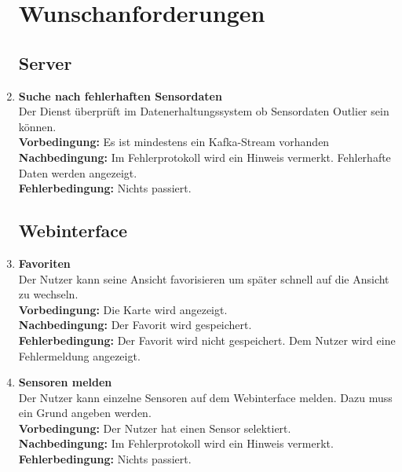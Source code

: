 \begin{enumerate}[label=\textbf{WF\arabic{enumi}0}]
	\setcounter{enumi}{99}
	\section{Wunschanforderungen}
	
	\subsection{Server}
	
	\item \textbf{Suche nach fehlerhaften Sensordaten}\\
	Der Dienst überprüft im Datenerhaltungssystem ob Sensordaten Outlier sein können.\\
	\textbf{Vorbedingung:} Es ist mindestens ein Kafka-Stream vorhanden\\
	\textbf{Nachbedingung:} Im Fehlerprotokoll wird ein Hinweis vermerkt. Fehlerhafte Daten werden angezeigt.\\
	\textbf{Fehlerbedingung:} Nichts passiert.
		
	\subsection{Webinterface}
	\setcounter{enumi}{199}
	
	\item \textbf{Favoriten}\\
		Der Nutzer kann seine Ansicht favorisieren um später schnell auf die Ansicht zu wechseln.\\
		\textbf{Vorbedingung:} Die Karte wird angezeigt.\\
		\textbf{Nachbedingung:} Der Favorit wird gespeichert.\\
		\textbf{Fehlerbedingung:} Der Favorit wird nicht gespeichert. Dem Nutzer wird eine Fehlermeldung angezeigt.
	
	\item \textbf{Sensoren melden}\\
		Der Nutzer kann einzelne Sensoren auf dem Webinterface melden. Dazu muss ein Grund angeben werden.\\
		\textbf{Vorbedingung:} Der Nutzer hat einen Sensor selektiert.\\
		\textbf{Nachbedingung:} Im Fehlerprotokoll wird ein Hinweis vermerkt.\\
		\textbf{Fehlerbedingung:} Nichts passiert.
		

\end{enumerate}
